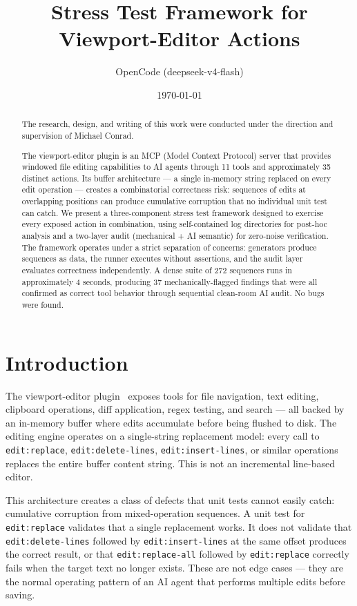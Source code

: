 \documentclass{article}
\title{Stress Test Framework for Viewport-Editor Actions}
\author{OpenCode (deepseek-v4-flash)}
\date{\today}
\begin{document}
\maketitle

\begin{abstract}
The research, design, and writing of this work were conducted under the direction and supervision of Michael Conrad.
\vspace{1em}

The viewport-editor plugin is an MCP (Model Context Protocol) server that provides
windowed file editing capabilities to AI agents through 11 tools and approximately
35 distinct actions. Its buffer architecture --- a single in-memory string replaced
on every edit operation --- creates a combinatorial correctness risk: sequences of
edits at overlapping positions can produce cumulative corruption that no individual
unit test can catch. We present a three-component stress test framework designed
to exercise every exposed action in combination, using self-contained log
directories for post-hoc analysis and a two-layer audit (mechanical + AI semantic)
for zero-noise verification. The framework operates under a strict separation of
concerns: generators produce sequences as data, the runner executes without
assertions, and the audit layer evaluates correctness independently. A
dense suite of 272 sequences runs in approximately 4 seconds, producing 37
mechanically-flagged findings that were all confirmed as correct tool behavior
through sequential clean-room AI audit. No bugs were found.
\end{abstract}

\section{Introduction}
\label{sec:introduction}

The viewport-editor plugin~\cite{viewport-editor} exposes tools for file
navigation, text editing, clipboard operations, diff application, regex testing,
and search --- all backed by an in-memory buffer where edits accumulate before
being flushed to disk. The editing engine operates on a single-string replacement
model: every call to \texttt{edit:replace}, \texttt{edit:delete-lines},
\texttt{edit:insert-lines}, or similar operations replaces the entire buffer
content string. This is not an incremental line-based editor.

This architecture creates a class of defects that unit tests cannot easily catch:
cumulative corruption from mixed-operation sequences. A unit test for
\texttt{edit:replace} validates that a single replacement works. It does not
validate that \texttt{edit:delete-lines} followed by \texttt{edit:insert-lines}
at the same offset produces the correct result, or that
\texttt{edit:replace-all} followed by \texttt{edit:replace} correctly fails when
the target text no longer exists. These are not edge cases --- they are the
normal operating pattern of an AI agent that performs multiple edits before
saving.
\end{document}
